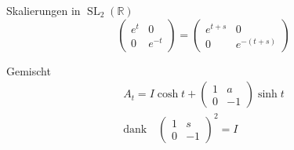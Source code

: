 \begin{frame}[t]
\begin{columns}[t,onlytextwidth]
\begin{column}{0.48\textwidth}
\begin{block}{Skalierungen in $\operatorname{SL}_2(\mathbb{R})$}
\[\begin{pmatrix}
e^t&0\\0&e^{-t}
\end{pmatrix}
=
\begin{pmatrix}
e^{t+s}&0\\0&e^{-(t+s)}
\end{pmatrix}
\]
\end{block}
\vspace{-12pt}
\begin{block}{Gemischt}
\vspace{-12pt}
\begin{gather*}
A_t = I \cosh t + \begin{pmatrix}1&a\\0&-1\end{pmatrix}\sinh t
\\
\text{dank}\quad
\begin{pmatrix}1&s\\0&-1\end{pmatrix}^2
=I
\end{gather*}
\end{block}
\end{column}
\end{columns}
\end{frame}
\egroup
